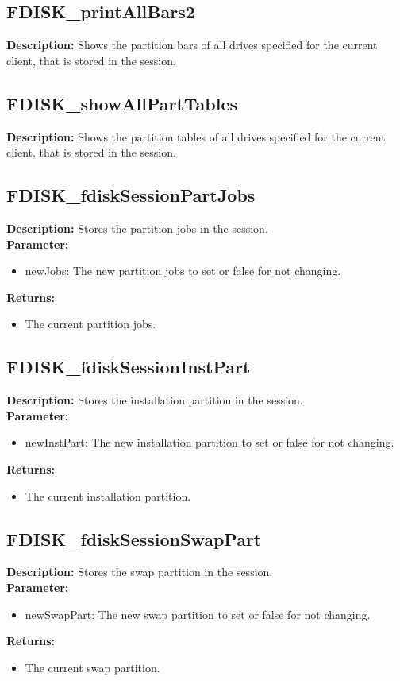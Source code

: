 \subsection{FDISK\_printAllBars2}
\textbf{Description:} Shows the partition bars of all drives specified for the current client, that is stored in the session.\\

\subsection{FDISK\_showAllPartTables}
\textbf{Description:} Shows the partition tables of all drives specified for the current client, that is stored in the session.\\

\subsection{FDISK\_fdiskSessionPartJobs}
\textbf{Description:} Stores the partition jobs in the session.\\
\textbf{Parameter:}
\begin{itemize}
\item newJobs: The new partition jobs to set or false for not changing.
\end{itemize}
\textbf{Returns:}
\begin{itemize}
\item The current partition jobs.
\end{itemize}

\subsection{FDISK\_fdiskSessionInstPart}
\textbf{Description:} Stores the installation partition in the session.\\
\textbf{Parameter:}
\begin{itemize}
\item newInstPart: The new installation partition to set or false for not changing.
\end{itemize}
\textbf{Returns:}
\begin{itemize}
\item The current installation partition.
\end{itemize}

\subsection{FDISK\_fdiskSessionSwapPart}
\textbf{Description:} Stores the swap partition in the session.\\
\textbf{Parameter:}
\begin{itemize}
\item newSwapPart: The new swap partition to set or false for not changing.
\end{itemize}
\textbf{Returns:}
\begin{itemize}
\item The current swap partition.
\end{itemize}

